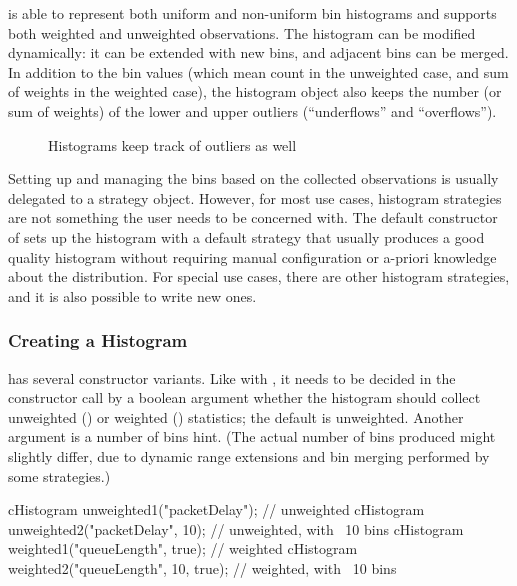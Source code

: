  is able to represent both uniform and non-uniform
bin histograms and supports both weighted and unweighted observations.
The histogram can be modified dynamically: it can be extended with new bins,
and adjacent bins can be merged. In addition to the bin values (which mean
count in the unweighted case, and sum of weights in the weighted case),
the histogram object also keeps the number (or sum of weights) of the
lower and upper outliers (``underflows'' and ``overflows'').

\begin{figure}[htbp]
  \begin{center}
    
    \caption{Histograms keep track of outliers as well}
  \end{center}
\end{figure}

Setting up and managing the bins based on the collected observations
is usually delegated to a strategy object. However, for most
use cases, histogram strategies are not something the user needs
to be concerned with. The default constructor of 
sets up the histogram with a default strategy that usually produces
a good quality histogram without requiring manual configuration or a-priori
knowledge about the distribution. For special use cases, there are
other histogram strategies, and it is also possible to write new ones.

\subsubsection{Creating a Histogram}
\label{sec:sim-lib:creating-a-histogram}

 has several constructor variants. Like with
, it needs to be decided in the constructor call
by a boolean argument whether the histogram should collect
unweighted () or weighted () statistics;
the default is unweighted. Another argument is a number of bins
hint. (The actual number of bins produced might slightly differ,
due to dynamic range extensions and bin merging performed by
some strategies.)

\begin{cpp}
cHistogram unweighted1("packetDelay");  // unweighted
cHistogram unweighted2("packetDelay", 10);  // unweighted, with ~10 bins
cHistogram weighted1("queueLength", true); // weighted
cHistogram weighted2("queueLength", 10, true); // weighted, with ~10 bins
\end{cpp}

